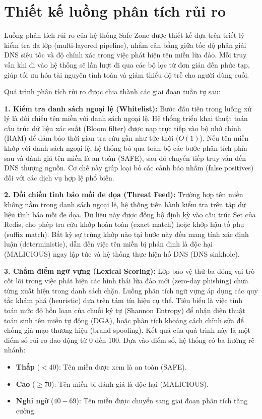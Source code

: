 \section{Thiết kế luồng phân tích rủi ro}

Luồng phân tích rủi ro của hệ thống Safe Zone được thiết kế dựa trên triết lý kiểm tra đa lớp (multi-layered pipeline), nhằm cân bằng giữa tốc độ phân giải DNS siêu tốc và độ chính xác trong việc phát hiện tên miền lừa đảo. Mỗi truy vấn khi đi vào hệ thống sẽ lần lượt đi qua các bộ lọc từ đơn giản đến phức tạp, giúp tối ưu hóa tài nguyên tính toán và giảm thiểu độ trễ cho người dùng cuối.



Quá trình phân tích rủi ro được chia thành các giai đoạn tuần tự sau:

\textbf{1. Kiểm tra danh sách ngoại lệ (Whitelist):}
Bước đầu tiên trong luồng xử lý là đối chiếu tên miền với danh sách ngoại lệ. Hệ thống triển khai thuật toán cấu trúc dữ liệu xác suất (Bloom filter) được nạp trực tiếp vào bộ nhớ chính (RAM) để đảm bảo thời gian tra cứu gần như tức thời ($O(1)$). Nếu tên miền khớp với danh sách ngoại lệ, hệ thống bỏ qua toàn bộ các bước phân tích phía sau và đánh giá tên miền là an toàn (SAFE), sau đó chuyển tiếp truy vấn đến DNS thượng nguồn. Cơ chế này giúp loại bỏ các cảnh báo nhầm (false positives) đối với các dịch vụ hợp lệ phổ biến.

\textbf{2. Đối chiếu tình báo mối đe dọa (Threat Feed):}
Trường hợp tên miền không nằm trong danh sách ngoại lệ, hệ thống tiến hành kiểm tra trên tập dữ liệu tình báo mối đe dọa. Dữ liệu này được đồng bộ định kỳ vào cấu trúc Set của Redis, cho phép tra cứu khớp hoàn toàn (exact match) hoặc khớp hậu tố phụ (suffix match). Bất kỳ sự trùng khớp nào tại bước này đều mang tính xác định luận (deterministic), dẫn đến việc tên miền bị phán định là độc hại (MALICIOUS) ngay lập tức và hệ thống thực hiện hố DNS (DNS sinkhole).

\textbf{3. Chấm điểm ngữ vựng (Lexical Scoring):}
Lớp bảo vệ thứ ba đóng vai trò cốt lõi trong việc phát hiện các hình thái lừa đảo mới (zero-day phishing) chưa từng xuất hiện trong danh sách chặn. Luồng phân tích ngữ vựng áp dụng các quy tắc khám phá (heuristic) dựa trên tám tín hiệu cụ thể. Tiêu biểu là việc tính toán mức độ hỗn loạn của chuỗi ký tự (Shannon Entropy) để nhận diện thuật toán sinh tên miền tự động (DGA), hoặc phân tích khoảng cách chỉnh sửa để chống giả mạo thương hiệu (brand spoofing). Kết quả của quá trình này là một điểm số rủi ro dao động từ 0 đến 100. Dựa vào điểm số, hệ thống có ba hướng rẽ nhánh:
\begin{itemize}
    \item \textbf{Thấp} ($< 40$): Tên miền được xem là an toàn (SAFE).
    \item \textbf{Cao} ($\ge 70$): Tên miền bị đánh giá là độc hại (MALICIOUS).
    \item \textbf{Nghi ngờ} ($40 - 69$): Tên miền được chuyển sang giai đoạn phân tích tăng cường.
\end{itemize}

